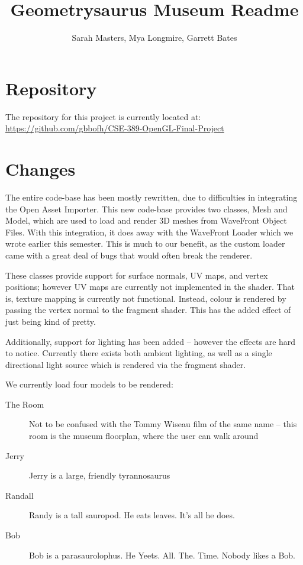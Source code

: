 \documentclass{article}[12pt]
\title{Geometrysaurus Museum Readme}
\author{Sarah Masters, Mya Longmire, Garrett Bates}
\begin{document}
\maketitle

\section{Repository}

The repository for this project is currently located at: \\

\url{https://github.com/gbbofh/CSE-389-OpenGL-Final-Project}

\section{Changes}

The entire code-base has been mostly rewritten, due to difficulties in
integrating the Open Asset Importer. This new code-base provides two classes,
Mesh and Model, which are used to load and render 3D meshes from WaveFront
Object Files. With this integration, it does away with the WaveFront Loader
which we wrote earlier this semester. This is much to our benefit, as the custom
loader came with a great deal of bugs that would often break the renderer.

These classes provide support for surface normals, UV maps, and vertex
positions; however UV maps are currently not implemented in the shader. That is,
texture mapping is currently not functional. Instead, colour is rendered by
passing the vertex normal to the fragment shader. This has the added effect of
just being kind of pretty.

Additionally, support for lighting has been added -- however the effects are
hard to notice. Currently there exists both ambient lighting, as well as a
single directional light source which is rendered via the fragment shader.

We currently load four models to be rendered:

\begin{description}
        \item[The Room]{Not to be confused with the Tommy Wiseau film of the
                same name -- this room is the museum floorplan, where the user
                can walk around}
        \item[Jerry]{Jerry is a large, friendly tyrannosaurus}
        \item[Randall]{Randy is a tall sauropod. He eats leaves. It's all he does.}
        \item[Bob]{Bob is a parasaurolophus. He Yeets. All. The. Time.
                Nobody likes a Bob.}
\end{description}
\end{document}
